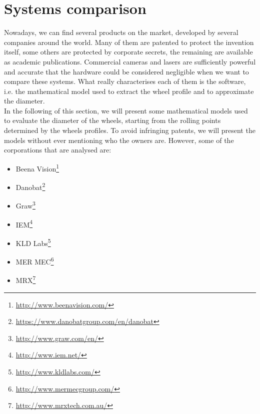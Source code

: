 \section{Systems comparison}
\label{sec:sys-cmp}
Nowadays, we can find several products on the market, developed by several companies around the world. Many of them are patented to protect the invention itself, some others are protected by corporate secrets, the remaining are available as academic publications. Commercial cameras and lasers are sufficiently powerful and accurate that the hardware could be considered negligible when we want to compare these systems. What really characterises each of them is the software, i.e. the mathematical model used to extract the wheel profile and to approximate the diameter. \\

In the following of this section, we will present some mathematical models used to evaluate the diameter of the wheels, starting from the rolling points determined by the wheels profiles. To avoid infringing patents, we will present the models without ever mentioning who the owners are. However, some of the corporations that are analysed are: %
  \begin{itemize}
    \item Beena Vision\footnote{\url{http://www.beenavision.com/}}
    \item Danobat\footnote{\url{https://www.danobatgroup.com/en/danobat}}
    \item Graw\footnote{\url{http://www.graw.com/en/}}
    \item IEM\footnote{\url{http://www.iem.net/}}
    \item KLD Labs\footnote{\url{http://www.kldlabs.com/}}
    \item MER MEC\footnote{\url{http://www.mermecgroup.com/}}
    \item MRX\footnote{\url{http://www.mrxtech.com.au/}}
  \end{itemize}



